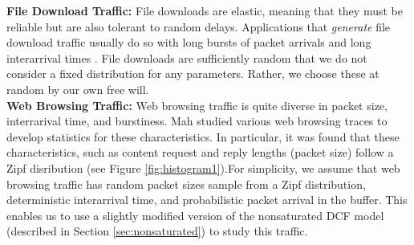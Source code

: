 \documentclass{llncs}
\begin{document}
\noindent
\textbf{File Download Traffic:} File downloads are elastic, meaning that they must be reliable but are also tolerant to random delays. Applications that \emph{generate} file download traffic usually do so with long bursts of packet arrivals and long interarrival times \cite{kumar2004communication}. File downloads are sufficiently random that we do not consider a fixed distribution for any parameters. Rather, we choose these at random by our own free will. \\

\noindent
\textbf{Web Browsing Traffic:} Web browsing traffic is quite diverse in packet size, interrarival time, and burstiness. Mah \cite{mah1997empirical} studied various web browsing traces to develop statistics for these characteristics. In particular, it was found that these characteristics, such as content request and reply lengths (packet size) follow a Zipf disribution (see Figure \ref{fig:histogram1}).For simplicity, we assume that web browsing traffic has random packet sizes sample from a Zipf distribution, deterministic interarrival time, and probabilistic packet arrival in the buffer. This enables us to use a slightly modified version of the nonsaturated DCF model (described in Section \ref{sec:nonsaturated}) to study this traffic. \\
\end{document}

